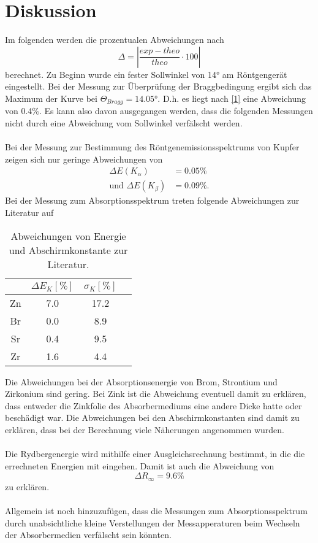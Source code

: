 \section{Diskussion}
\label{sec:Diskussion}
Im folgenden werden die prozentualen Abweichungen nach 
\begin{equation}\label{1}
    \Delta = |\frac{exp - theo}{theo} \cdot 100|
\end{equation}
berechnet.
Zu Beginn wurde ein fester Sollwinkel von 14° am Röntgengerät eingestellt. Bei der Messung zur Überprüfung der Braggbedingung 
ergibt sich das Maximum der Kurve bei $\Theta_{Bragg} = 14.05°$. D.h. es liegt nach \autoref{1} eine Abweichung von 0.4\%.
Es kann also davon ausgegangen werden, dass die folgenden Messungen nicht durch eine Abweichung vom Sollwinkel verfälscht werden.
\\
\\
Bei der Messung zur Bestimmung des Röntgenemissionsspektrums von Kupfer zeigen sich nur geringe Abweichungen von
\begin{align*}
    \Delta E(K_{\alpha}) &= 0.05\%\\
    \text{und } \Delta E(K_{\beta}) &= 0.09\%.
\end{align*}
Bei der Messung zum Absorptionsspektrum treten folgende Abweichungen zur Literatur \cite{energie_k} auf
\begin{table}\label{tab:2}
    \centering
    \begin{tabular}{c c c c}
        \toprule
        {} & {$\Delta E_{K}\left[\unit{\%}\right]$} & {$\sigma_{K}\left[\unit{\%}\right]$}\\
        \midrule
        Zn & 7.0 & 17.2\\
        Br & 0.0 & 8.9 \\
        Sr & 0.4 & 9.5 \\
        Zr & 1.6 & 4.4 \\       
        \bottomrule
    \end{tabular}
    \caption{Abweichungen von Energie und Abschirmkonstante zur Literatur.}
  \end{table}
Die Abweichungen bei der Absorptionsenergie von Brom, Strontium und Zirkonium sind gering. Bei Zink ist die Abweichung eventuell damit zu erklären, dass entweder die Zinkfolie
des Absorbermediums eine andere Dicke hatte oder beschädigt war. 
Die Abweichungen bei den Abschirmkonstanten sind damit zu erklären, dass bei der Berechnung viele Näherungen angenommen wurden. 
\\
\\
Die Rydbergenergie wird mithilfe einer Ausgleichsrechnung bestimmt, in die die errechneten Energien mit eingehen. Damit ist auch die Abweichung von 
\begin{equation*}
    \Delta R_{\infty} = 9.6\%
\end{equation*}
zu erklären.
\\
\\
Allgemein ist noch hinzuzufügen, dass die Messungen zum Absorptionsspektrum durch unabsichtliche kleine Verstellungen der Messapperaturen beim Wechseln der
Absorbermedien verfälscht sein könnten. 